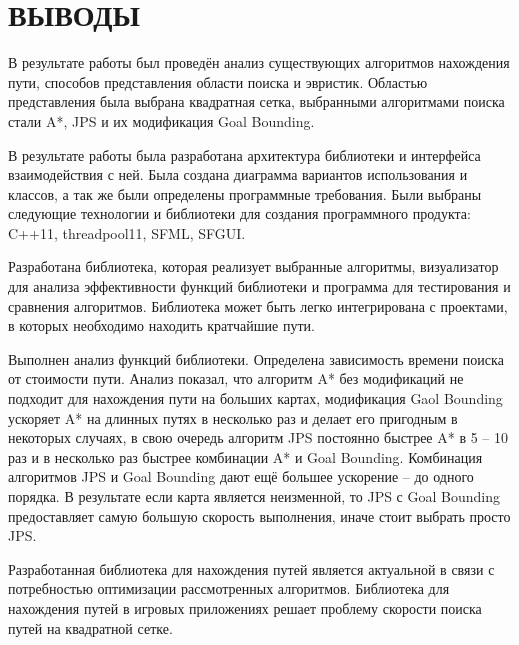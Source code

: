 \section*{ВЫВОДЫ}

\vspace{1\baselineskip} 


В результате работы был проведён анализ существующих алгоритмов нахождения пути, способов представления области поиска и эвристик. Областью представления была выбрана квадратная сетка, выбранными алгоритмами поиска стали A*, JPS и их модификация Goal Bounding.

В результате работы была разработана архитектура библиотеки и интерфейса взаимодействия с ней. Была создана диаграмма вариантов использования и классов, а так же были определены программные требования. Были выбраны следующие технологии и библиотеки для создания программного продукта: C++11, threadpool11, SFML, SFGUI.

Разработана библиотека, которая реализует выбранные алгоритмы, визуализатор для анализа эффективности функций библиотеки и программа для тестирования и сравнения алгоритмов. Библиотека может быть легко интегрирована с проектами, в которых необходимо находить кратчайшие пути.

Выполнен анализ функций библиотеки. Определена зависимость времени поиска от стоимости пути. Анализ показал, что алгоритм A* без модификаций не подходит для нахождения пути на больших картах, модификация Gaol Bounding ускоряет A* на длинных путях в несколько раз и делает его пригодным в некоторых случаях, в свою очередь алгоритм JPS постоянно быстрее A* в 5 -- 10 раз и в несколько раз быстрее комбинации A* и Goal Bounding. Комбинация алгоритмов JPS и Goal Bounding дают ещё большее ускорение -- до одного порядка. В результате если карта является неизменной, то JPS с Goal Bounding предоставляет самую большую скорость выполнения, иначе стоит выбрать просто JPS.

Разработанная библиотека для нахождения путей является актуальной в связи с потребностью оптимизации рассмотренных алгоритмов. Библиотека для нахождения путей в игровых приложениях решает проблему скорости поиска путей на квадратной сетке.